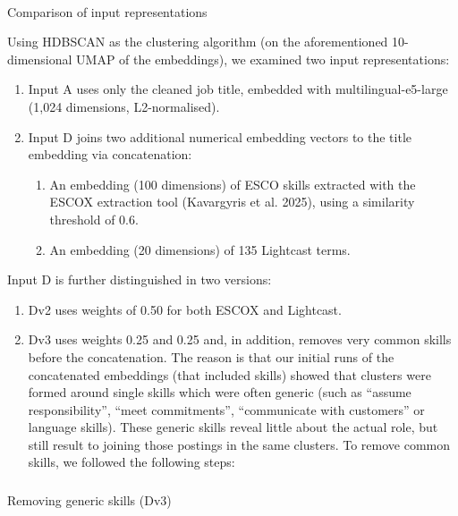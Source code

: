 \documentclass[
  letterpaper,
  DIV=11,
  numbers=noendperiod,
  sfdefaults=false]{scrartcl}
\makeatletter
\let\oldparagraph\paragraph
\renewcommand{\paragraph}{
    \@ifstar
      \xxxParagraphStar
      \xxxParagraphNoStar
  }
\newcommand{\xxxParagraphStar}[1]{\oldparagraph*{#1}\mbox{}}
\newcommand{\xxxParagraphNoStar}[1]{\oldparagraph{#1}\mbox{}}
\let\oldsubparagraph\subparagraph
\renewcommand{\subparagraph}{
    \@ifstar
      \xxxSubParagraphStar
      \xxxSubParagraphNoStar
  }
\newcommand{\xxxSubParagraphStar}[1]{\oldsubparagraph*{#1}\mbox{}}
\newcommand{\xxxSubParagraphNoStar}[1]{\oldsubparagraph{#1}\mbox{}}
\providecommand{\tightlist}{%
  \setlength{\itemsep}{0pt}\setlength{\parskip}{0pt}}
\makeatother
\begin{document}
\paragraph{Comparison of input
representations}\label{comparison-of-input-representations}

Using HDBSCAN as the clustering algorithm (on the aforementioned
10-dimensional UMAP of the embeddings), we examined two input
representations:

\begin{enumerate}
\def\labelenumi{\arabic{enumi}.}
\tightlist
\item
  Input A uses only the cleaned job title, embedded with
  multilingual-e5-large (1,024 dimensions, L2-normalised).
\item
  Input D joins two additional numerical embedding vectors to the title
  embedding via concatenation:

  \begin{enumerate}
  \def\labelenumii{\alph{enumii}.}
  \tightlist
  \item
    An embedding (100 dimensions) of ESCO skills extracted with the
    ESCOX extraction tool (Kavargyris et al. 2025), using a similarity
    threshold of 0.6.
  \item
    An embedding (20 dimensions) of 135 Lightcast terms.
  \end{enumerate}
\end{enumerate}

Input D is further distinguished in two versions:

\begin{enumerate}
\def\labelenumi{\arabic{enumi}.}
\tightlist
\item
  Dv2 uses weights of 0.50 for both ESCOX and Lightcast.
\item
  Dv3 uses weights 0.25 and 0.25 and, in addition, removes very common
  skills before the concatenation. The reason is that our initial runs
  of the concatenated embeddings (that included skills) showed that
  clusters were formed around single skills which were often generic
  (such as ``assume responsibility'', ``meet commitments'',
  ``communicate with customers'' or language skills). These generic
  skills reveal little about the actual role, but still result to
  joining those postings in the same clusters. To remove common skills,
  we followed the following steps:
\end{enumerate}

\subparagraph{Removing generic skills
(Dv3)}\label{removing-generic-skills-dv3}
\end{document}
